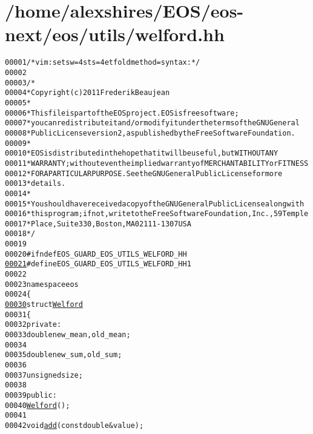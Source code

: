\hypertarget{welford_8hh_source}{
\section{/home/alexshires/EOS/eos-\/next/eos/utils/welford.hh}
}


\begin{footnotesize}\begin{alltt}
00001 \textcolor{comment}{/* vim: set sw=4 sts=4 et foldmethod=syntax : */}
00002 
00003 \textcolor{comment}{/*}
00004 \textcolor{comment}{ * Copyright (c) 2011 Frederik Beaujean}
00005 \textcolor{comment}{ *}
00006 \textcolor{comment}{ * This file is part of the EOS project. EOS is free software;}
00007 \textcolor{comment}{ * you can redistribute it and/or modify it under the terms of the GNU General}
00008 \textcolor{comment}{ * Public License version 2, as published by the Free Software Foundation.}
00009 \textcolor{comment}{ *}
00010 \textcolor{comment}{ * EOS is distributed in the hope that it will be useful, but WITHOUT ANY}
00011 \textcolor{comment}{ * WARRANTY; without even the implied warranty of MERCHANTABILITY or FITNESS}
00012 \textcolor{comment}{ * FOR A PARTICULAR PURPOSE.  See the GNU General Public License for more}
00013 \textcolor{comment}{ * details.}
00014 \textcolor{comment}{ *}
00015 \textcolor{comment}{ * You should have received a copy of the GNU General Public License along with}
00016 \textcolor{comment}{ * this program; if not, write to the Free Software Foundation, Inc., 59 Temple}
00017 \textcolor{comment}{ * Place, Suite 330, Boston, MA  02111-1307  USA}
00018 \textcolor{comment}{ */}
00019 
00020 \textcolor{preprocessor}{#ifndef EOS\_GUARD\_EOS\_UTILS\_WELFORD\_HH}
\hypertarget{welford_8hh_source_l00021}{}\hyperlink{welford_8hh_ac70488a5220043c891e5f20ba1006fb3}{00021} \textcolor{preprocessor}{}\textcolor{preprocessor}{#define EOS\_GUARD\_EOS\_UTILS\_WELFORD\_HH 1}
00022 \textcolor{preprocessor}{}
00023 \textcolor{keyword}{namespace }eos
00024 \{
\hypertarget{welford_8hh_source_l00030}{}\hyperlink{structeos_1_1Welford}{00030}     \textcolor{keyword}{struct }\hyperlink{structeos_1_1Welford}{Welford}
00031     \{
00032         \textcolor{keyword}{private}:
00033             \textcolor{keywordtype}{double} new\_mean, old\_mean;
00034 
00035             \textcolor{keywordtype}{double} new\_sum, old\_sum;
00036 
00037             \textcolor{keywordtype}{unsigned} size;
00038 
00039         \textcolor{keyword}{public}:
00040             \hyperlink{structeos_1_1Welford_aa8a5cede9b83f8407c0475278fb3929d}{Welford}();
00041 
00042             \textcolor{keywordtype}{void} \hyperlink{structeos_1_1Welford_a42e2ae402d7f7944fea47ab9676d3ba5}{add}(\textcolor{keyword}{const} \textcolor{keywordtype}{double} & value);

\end{alltt}
\end{footnotesize}

